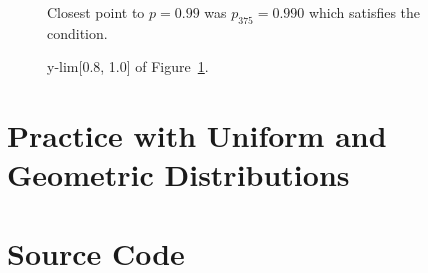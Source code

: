 \documentclass[twocolumn]{article}
\begin{document}
\begin{figure}[H]
    \centering
    \caption{Closest point to $p=0.99$ was $p_{375}=0.990$ which satisfies the condition.}
    \label{fig:Figure2}
\end{figure}

\begin{figure}[H]
    \centering
    \caption{y-lim[0.8, 1.0] of Figure~\ref{fig:Figure2}.}
\end{figure}


\section{Practice with Uniform and Geometric Distributions}
\lipsum[1] %

\section{Source Code}
\lipsum[1] %


%
%
\end{document}
